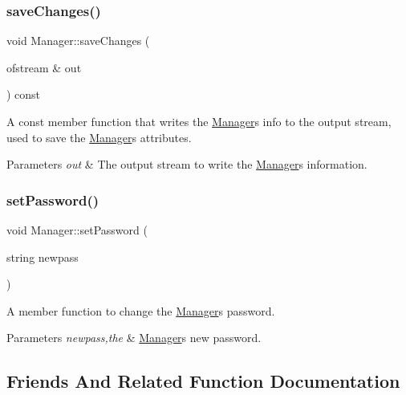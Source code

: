 \subsubsection{\texorpdfstring{save\+Changes()}{saveChanges()}}
{\footnotesize\ttfamily void Manager\+::save\+Changes (\begin{DoxyParamCaption}\item[{ofstream \&}]{out }\end{DoxyParamCaption}) const}

A const member function that writes the \hyperlink{class_manager}{Manager}\textquotesingle{}s info to the output stream, used to save the \hyperlink{class_manager}{Manager}\textquotesingle{}s attributes. 
\begin{DoxyParams}{Parameters}
{\em out} & The output stream to write the \hyperlink{class_manager}{Manager}\textquotesingle{}s information. \\
\hline
\end{DoxyParams}
\hypertarget{class_manager_a19e98a7209d6218c960eb278ccbaf6cb}{}\label{class_manager_a19e98a7209d6218c960eb278ccbaf6cb} 
\subsubsection{\texorpdfstring{set\+Password()}{setPassword()}}
{\footnotesize\ttfamily void Manager\+::set\+Password (\begin{DoxyParamCaption}\item[{string}]{newpass }\end{DoxyParamCaption})}

A member function to change the \hyperlink{class_manager}{Manager}\textquotesingle{}s password. 
\begin{DoxyParams}{Parameters}
{\em newpass,the} & \hyperlink{class_manager}{Manager}\textquotesingle{}s new password. \\
\hline
\end{DoxyParams}


\subsection{Friends And Related Function Documentation}
\hypertarget{class_manager_a99e92cb4ec06950c06aaa800e538b6fd}{}\label{class_manager_a99e92cb4ec06950c06aaa800e538b6fd} 
